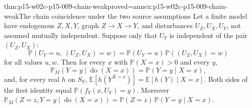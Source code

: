\begin{hbtheorem}{thm:p15-w02c-p15-009-chain-weak}{proved=annex:p15-w02c-p15-009-chain-weak}{The chain coincidence under the two source assumptions}
Let a finite model have endogenous \(Z,X,Y\), graph
\(Z\to X\to Y\), and disturbances \(U_Z,U_X,U_Y\), not assumed mutually
independent. Suppose only that \(U_Y\) is independent of the pair
\((U_Z,U_X)\):
\[
 \mathbb P(U_Y=u,\ (U_Z,U_X)=w)=\mathbb P(U_Y=u)\,\mathbb P((U_Z,U_X)=w)
\]
for all values \(u,w\). Then for every \(x\) with
\(\mathbb P(X=x)>0\) and every \(y\),
\[
 \mathbb P_M(Y=y\mid\operatorname{do}(X=x))=\mathbb P(Y=y\mid X=x),
\]
and, for every real \(h\) on \(S_Y\),
\(\mathbb E[h(Y^{X=x})]=\mathbb E[h(Y)\mid X=x]\). Both sides of the
first identity equal \(\mathbb P(f_Y(x,U_Y)=y)\). Moreover
\(\mathbb P_M(Z=z,Y=y\mid\operatorname{do}(X=x))
=\mathbb P(Z=z)\,\mathbb P(Y=y\mid X=x)\).
\end{hbtheorem}

